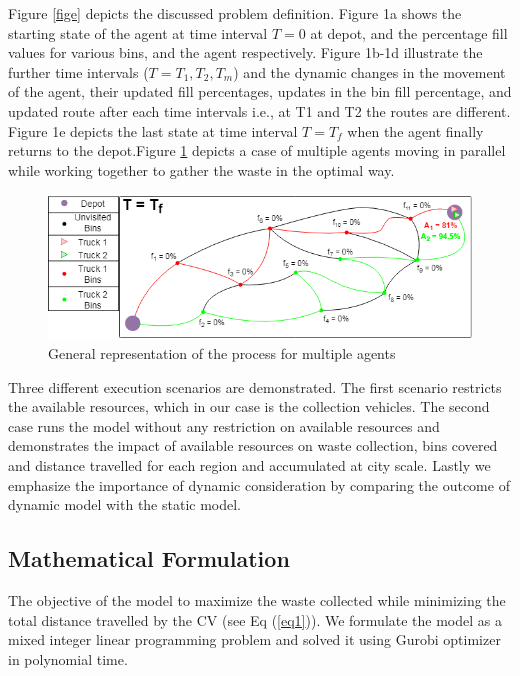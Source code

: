 \documentclass[12pt]{article}
\begin{document}
Figure \ref{fige} depicts the discussed problem definition. Figure 1a shows the starting state of the agent at time interval $T=0$ at depot, and the percentage fill values for various bins, and the agent respectively. Figure 1b-1d illustrate the further time intervals ($T=T_1,T_2,T_m$) and the dynamic changes in the movement of the agent, their updated fill percentages, updates in the bin fill percentage, and updated route after each time intervals i.e., at T1 and T2 the routes are different. Figure 1e depicts the last state at time interval $T=T_f$ when the agent finally returns to the depot.Figure \ref{fige2} depicts a case of multiple agents moving in parallel while working together to gather the waste in the optimal way.  

\begin{figure}[H]
    \centering
    \includegraphics[scale=0.6]{ExplanationFigure2.png}
    \caption{General representation of the process for multiple agents}\label{fige2}
\end{figure}

Three different execution scenarios are demonstrated. The first scenario restricts the available resources, which in our case is the collection vehicles. The second case runs the model without any restriction on available resources and demonstrates the impact of available resources on waste collection, bins covered and distance travelled for each region and accumulated at city scale. Lastly we emphasize the importance of dynamic consideration by comparing the outcome of dynamic model with the static model.

\subsection {Mathematical Formulation}

The objective of the model to maximize the waste collected while minimizing the total distance travelled by the CV (see Eq (\ref{eq1})). We formulate the model as a mixed integer linear programming problem and solved it using Gurobi optimizer \cite{gurobi} in polynomial time.
\end{document}
